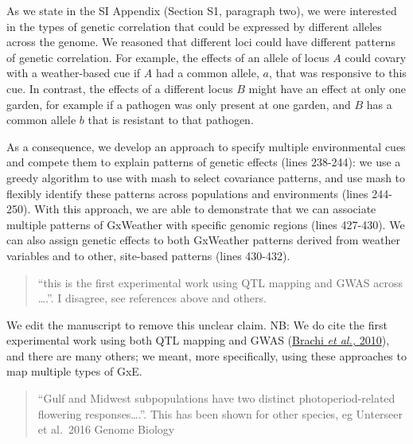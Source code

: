 \documentclass[
  letterpaper,
  DIV=11,
  numbers=noendperiod]{scrartcl}
\begin{document}
As we state in the SI Appendix (Section S1, paragraph two), we were
interested in the types of genetic correlation that could be expressed
by different alleles across the genome. We reasoned that different loci
could have different patterns of genetic correlation. For example, the
effects of an allele of locus \(A\) could covary with a weather-based
cue if \(A\) had a common allele, \(a\), that was responsive to this
cue. In contrast, the effects of a different locus \(B\) might have an
effect at only one garden, for example if a pathogen was only present at
one garden, and \(B\) has a common allele \(b\) that is resistant to
that pathogen.

As a consequence, we develop an approach to specify multiple
environmental cues and compete them to explain patterns of genetic
effects (lines 238-244): we use a greedy algorithm to use with mash to
select covariance patterns, and use mash to flexibly identify these
patterns across populations and environments (lines 244-250). With this
approach, we are able to demonstrate that we can associate multiple
patterns of GxWeather with specific genomic regions (lines 427-430). We
can also assign genetic effects to both GxWeather patterns derived from
weather variables and to other, site-based patterns (lines 430-432).

\begin{quote}
\begin{tcolorbox}[enhanced jigsaw, rightrule=.15mm, colframe=quarto-callout-warning-color-frame, leftrule=.75mm, arc=.35mm, colback=white, opacityback=0, left=2mm, breakable, toprule=.15mm, bottomrule=.15mm]

``this is the first experimental work using QTL mapping and GWAS across
\ldots.''. I disagree, see references above and others.

\end{tcolorbox}
\end{quote}

We edit the manuscript to remove this unclear claim. NB: We do cite the
first experimental work using both QTL mapping and GWAS
(\href{https://doi.org/10.1371/journal.pgen.1000940}{Brachi \emph{et
al.,} 2010}), and there are many others; we meant, more specifically,
using these approaches to map multiple types of GxE.

\begin{quote}
\begin{tcolorbox}[enhanced jigsaw, rightrule=.15mm, colframe=quarto-callout-warning-color-frame, leftrule=.75mm, arc=.35mm, colback=white, opacityback=0, left=2mm, breakable, toprule=.15mm, bottomrule=.15mm]

``Gulf and Midwest subpopulations have two distinct photoperiod-related
flowering responses\ldots.''. This has been shown for other species, eg
Unterseer et al.~2016 Genome Biology

\end{tcolorbox}
\end{quote}
\end{document}
